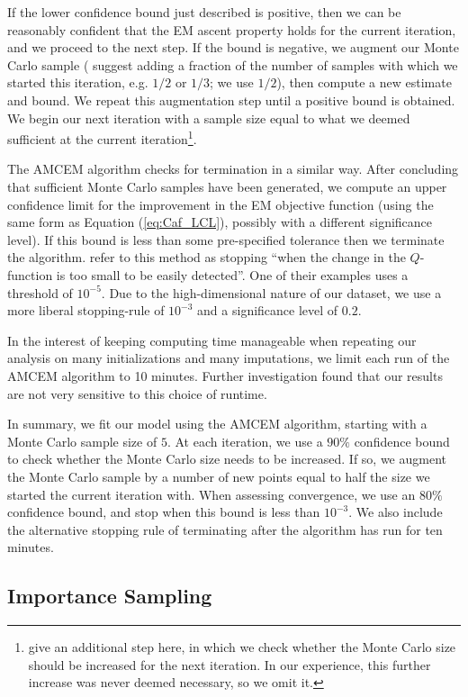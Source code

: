\documentclass[11pt, oneside]{article}   	%
\begin{document}
If the lower confidence bound just described is positive, then we can be reasonably confident that the EM ascent property holds for the current iteration, and we proceed to the next step. If the bound is negative, we augment our Monte Carlo sample (\citeauthor{Caf05} suggest adding a fraction of the number of samples with which we started this iteration, e.g. $1/2$ or $1/3$; we use $1/2$), then compute a new estimate and bound. We repeat this augmentation step until a positive bound is obtained. We begin our next iteration with a sample size equal to what we deemed sufficient at the current iteration\footnote{\citeauthor{Caf05} give an additional step here, in which we check whether the Monte Carlo size should be increased for the next iteration. In our experience, this further increase was never deemed necessary, so we omit it.}.

The AMCEM algorithm checks for termination in a similar way. After concluding that sufficient Monte Carlo samples have been generated, we compute an upper confidence limit for the improvement in the EM objective function (using the same form as Equation (\ref{eq:Caf_LCL}), possibly with a different significance level). If this bound is less than some pre-specified tolerance then we terminate the algorithm. \citeauthor{Caf05} refer to this method as stopping ``when the change in the $Q$-function is too small to be easily detected''. One of their examples uses a threshold of $10^{-5}$. Due to the high-dimensional nature of our dataset, we use a more liberal stopping-rule of $10^{-3}$ and a significance level of $0.2$. 

In the interest of keeping computing time manageable when repeating our analysis on many initializations and many imputations, we limit each run of the AMCEM algorithm to 10 minutes. Further investigation found that our results are not very sensitive to this choice of runtime.

In summary, we fit our model using the AMCEM algorithm, starting with a Monte Carlo sample size of $5$. At each iteration, we use a $90\%$ confidence bound to check whether the Monte Carlo size needs to be increased. If so, we augment the Monte Carlo sample by a number of new points equal to half the size we started the current iteration with. When assessing convergence, we use an $80\%$ confidence bound, and stop when this bound is less than $10^{-3}$. We also include the alternative stopping rule of terminating after the algorithm has run for ten minutes.

\subsection{Importance Sampling}
\label{sec:imp_samp}
\end{document}
